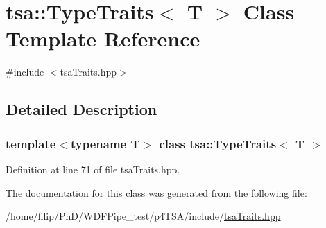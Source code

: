 \hypertarget{classtsa_1_1_type_traits}{}\section{tsa\+:\+:Type\+Traits$<$ T $>$ Class Template Reference}
\label{classtsa_1_1_type_traits}


{\ttfamily \#include $<$tsa\+Traits.\+hpp$>$}



\subsection{Detailed Description}
\subsubsection*{template$<$typename T$>$\newline
class tsa\+::\+Type\+Traits$<$ T $>$}



Definition at line 71 of file tsa\+Traits.\+hpp.



The documentation for this class was generated from the following file\+:\begin{DoxyCompactItemize}
\item 
/home/filip/\+Ph\+D/\+W\+D\+F\+Pipe\+\_\+test/p4\+T\+S\+A/include/\hyperlink{tsa_traits_8hpp}{tsa\+Traits.\+hpp}\end{DoxyCompactItemize}
